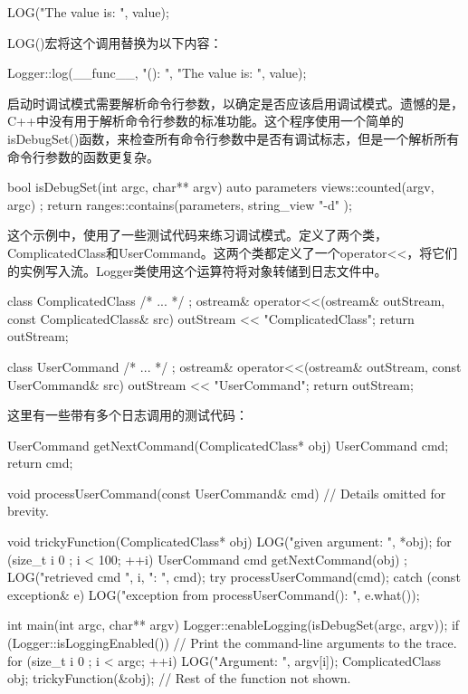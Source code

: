\begin{cpp}
LOG("The value is: ", value);
\end{cpp}

LOG()宏将这个调用替换为以下内容：

\begin{cpp}
Logger::log(__func__, "(): ", "The value is: ", value);
\end{cpp}

启动时调试模式需要解析命令行参数，以确定是否应该启用调试模式。遗憾的是，C++中没有用于解析命令行参数的标准功能。这个程序使用一个简单的isDebugSet()函数，来检查所有命令行参数中是否有调试标志，但是一个解析所有命令行参数的函数更复杂。

\begin{cpp}
bool isDebugSet(int argc, char** argv)
{
    auto parameters { views::counted(argv, argc) };
    return ranges::contains(parameters, string_view { "-d" });
}
\end{cpp}

这个示例中，使用了一些测试代码来练习调试模式。定义了两个类，ComplicatedClass和UserCommand。这两个类都定义了一个operator<{}<，将它们的实例写入流。Logger类使用这个运算符将对象转储到日志文件中。

\begin{cpp}
class ComplicatedClass { /* ... */ };
ostream& operator<<(ostream& outStream, const ComplicatedClass& src)
{
    outStream << "ComplicatedClass";
    return outStream;
}

class UserCommand { /* ... */ };
ostream& operator<<(ostream& outStream, const UserCommand& src)
{
    outStream << "UserCommand";
    return outStream;
}
\end{cpp}

这里有一些带有多个日志调用的测试代码：

\begin{cpp}
UserCommand getNextCommand(ComplicatedClass* obj)
{
    UserCommand cmd;
    return cmd;
}

void processUserCommand(const UserCommand& cmd)
{
    // Details omitted for brevity.
}

void trickyFunction(ComplicatedClass* obj)
{
    LOG("given argument: ", *obj);
    for (size_t i { 0 }; i < 100; ++i) {
        UserCommand cmd { getNextCommand(obj) };
        LOG("retrieved cmd ", i, ": ", cmd);
        try {
            processUserCommand(cmd);
        } catch (const exception& e) {
            LOG("exception from processUserCommand(): ", e.what());
        }
    }
}

int main(int argc, char** argv)
{
    Logger::enableLogging(isDebugSet(argc, argv));
    if (Logger::isLoggingEnabled()) {
        // Print the command-line arguments to the trace.
        for (size_t i { 0 }; i < argc; ++i) {
            LOG("Argument: ", argv[i]);
        }
    }
    ComplicatedClass obj;
    trickyFunction(&obj);
    // Rest of the function not shown.
}
\end{cpp}

